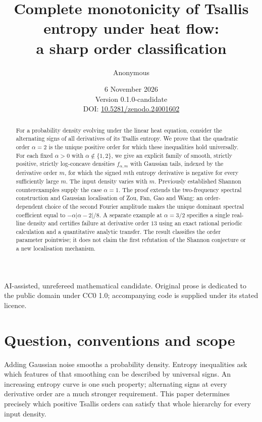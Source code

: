 \documentclass[
  11pt,
]{article}
\title{Complete monotonicity of Tsallis entropy under heat flow:\\a sharp order classification}
\author{Anonymous}
\date{6 November 2026\\Version 0.1.0-candidate\\\small DOI: \href{https://doi.org/10.5281/zenodo.24001602}{10.5281/zenodo.24001602}}
\begin{document}
\maketitle

AI-assisted, unrefereed mathematical candidate. Original prose is
dedicated to the public domain under CC0 1.0; accompanying code is
supplied under its stated licence.

\begin{abstract}

For a probability density evolving under the linear heat equation,
consider the alternating signs of all derivatives of its Tsallis
entropy. We prove that the quadratic order \(\alpha=2\) is the unique
positive order for which these inequalities hold universally. For each
fixed \(\alpha>0\) with \(\alpha\notin\{1,2\}\), we give an explicit
family of smooth, strictly positive, strictly log-concave densities
\(f_{\alpha,m}\) with Gaussian tails, indexed by the derivative order
\(m\), for which the signed \(m\)th entropy derivative is negative for
every sufficiently large \(m\). The input density varies with \(m\).
Previously established Shannon counterexamples supply the case
\(\alpha=1\). The proof extends the two-frequency spectral construction
and Gaussian localisation of Zou, Fan, Gao and Wang: an order-dependent
choice of the second Fourier amplitude makes the unique dominant
spectral coefficient equal to \(-\alpha|\alpha-2|/8\). A separate
example at \(\alpha=3/2\) specifies a single real-line density and
certifies failure at derivative order \(13\) using an exact rational
periodic calculation and a quantitative analytic transfer. The result
classifies the order parameter pointwise; it does not claim the first
refutation of the Shannon conjecture or a new localisation mechanism.

\end{abstract}

\section{Question, conventions and
scope}\label{question-conventions-and-scope}

Adding Gaussian noise smooths a probability density. Entropy
inequalities ask which features of that smoothing can be described by
universal signs. An increasing entropy curve is one such property;
alternating signs at every derivative order are a much stronger
requirement. This paper determines precisely which positive Tsallis
orders can satisfy that whole hierarchy for every input density.
\end{document}
